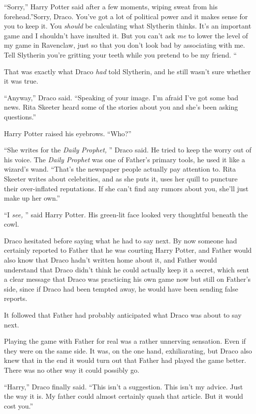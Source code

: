 ``Sorry,'' Harry Potter said after a few moments, wiping sweat from his
forehead.''Sorry, Draco. You've got a lot of political power and it
makes sense for you to keep it. You \emph{should} be calculating what
Slytherin thinks. It's an important game and I shouldn't have insulted
it. But you can't ask \emph{me} to lower the level of my game in
Ravenclaw, just so that you don't look bad by associating with me. Tell
Slytherin you're gritting your teeth while you pretend to be my friend.
``

That was exactly what Draco \emph{had} told Slytherin, and he still
wasn't sure whether it was true.

``Anyway,'' Draco said. ``Speaking of your image. I'm afraid I've got
some bad news. Rita Skeeter heard some of the stories about you and
she's been asking questions.''

Harry Potter raised his eyebrows. ``Who?''

``She writes for the \emph{Daily Prophet,} '' Draco said. He tried to keep
the worry out of his voice. The \emph{Daily Prophet} was one of Father's
primary tools, he used it like a wizard's wand. ``That's the newspaper
people actually pay attention to. Rita Skeeter writes about celebrities,
and as she puts it, uses her quill to puncture their over-inflated
reputations. If she can't find any rumors about you, she'll just make up
her own.''

``I \emph{see,} '' said Harry Potter. His green-lit face looked very
thoughtful beneath the cowl.

Draco hesitated before saying what he had to say next. By now someone
had certainly reported to Father that he was courting Harry Potter, and
Father would also know that Draco hadn't written home about it, and
Father would understand that Draco didn't think he could actually keep
it a secret, which sent a clear message that Draco was practicing his
own game now but still on Father's side, since if Draco had been tempted
away, he would have been sending false reports.

It followed that Father had probably anticipated what Draco was about to
say next.

Playing the game with Father for real was a rather unnerving sensation.
Even if they were on the same side. It was, on the one hand,
exhiliarating, but Draco also knew that in the end it would turn out
that Father had played the game better. There was no other way it could
possibly go.

``Harry,'' Draco finally said. ``This isn't a suggestion. This isn't my
advice. Just the way it is. My father could almost certainly quash that
article. But it would cost you.''

